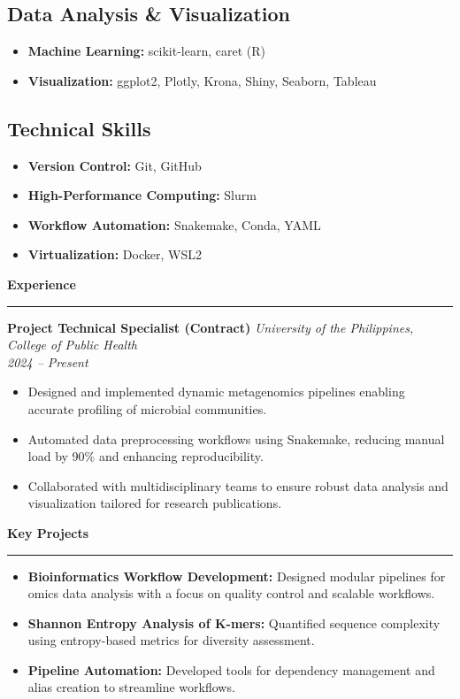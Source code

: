 \documentclass[a4paper,10pt]{article}
\newcommand{\sectiontitle}[1]{\vspace{10pt}\textbf{\Large #1}\vspace{5pt}\hrule\vspace{10pt}}
\begin{document}
	\subsection*{Data Analysis \& Visualization}
	\begin{itemize}[left=0pt]
		\item \textbf{Machine Learning:} scikit-learn, caret (R)
		\item \textbf{Visualization:} ggplot2, Plotly, Krona, Shiny, Seaborn, Tableau
	\end{itemize}
	
	\subsection*{Technical Skills}
	\begin{itemize}[left=0pt]
		\item \textbf{Version Control:} Git, GitHub
		\item \textbf{High-Performance Computing:} Slurm
		\item \textbf{Workflow Automation:} Snakemake, Conda, YAML
		\item \textbf{Virtualization:} Docker, WSL2
	\end{itemize}
	
	\sectiontitle{Experience}
	
	\textbf{Project Technical Specialist (Contract)} \hfill \textit{University of the Philippines, College of Public Health} \\
	\textit{2024 – Present}
	\begin{itemize}[left=0pt]
		\item Designed and implemented dynamic metagenomics pipelines enabling accurate profiling of microbial communities.
		\item Automated data preprocessing workflows using Snakemake, reducing manual load by 90\% and enhancing reproducibility.
		\item Collaborated with multidisciplinary teams to ensure robust data analysis and visualization tailored for research publications.
	\end{itemize}
	
	\sectiontitle{Key Projects}
	\begin{itemize}[left=0pt]
		\item \textbf{Bioinformatics Workflow Development:} Designed modular pipelines for omics data analysis with a focus on quality control and scalable workflows.
		\item \textbf{Shannon Entropy Analysis of K-mers:} Quantified sequence complexity using entropy-based metrics for diversity assessment.
		\item \textbf{Pipeline Automation:} Developed tools for dependency management and alias creation to streamline workflows.
	\end{itemize}
	
\end{document}
